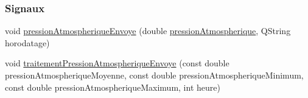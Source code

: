 \subsubsection*{Signaux}
\begin{DoxyCompactItemize}
\item 
void \hyperlink{class_infos_pression_atmospherique_ad5342b25c87fd5e41a89ad74b5f69c86}{pression\+Atmospherique\+Envoye} (double \hyperlink{class_infos_pression_atmospherique_a69f31dc0d0ef59f8ced23e4663ee1ab8}{pression\+Atmospherique}, Q\+String horodatage)
\item 
void \hyperlink{class_infos_pression_atmospherique_af759842c05a1e59b56d433e823bee341}{traitement\+Pression\+Atmospherique\+Envoye} (const double pression\+Atmospherique\+Moyenne, const double pression\+Atmospherique\+Minimum, const double pression\+Atmospherique\+Maximum, int heure)
\end{DoxyCompactItemize}
